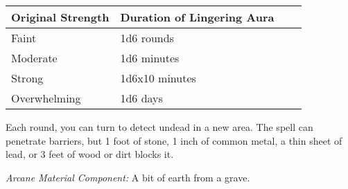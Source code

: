 \begin{longtable}{llll}
\hline
\multicolumn{1}{|p{1.203in}|}{\begin{minipage}[t]{1.203in}\raggedright
\textbf{Original Strength}\end{minipage}} & \multicolumn{1}{p{1.806in}|}{\begin{minipage}[t]{1.806in}\raggedright
\textbf{Duration of Lingering Aura}\end{minipage}}\\
\hline
\multicolumn{1}{p{0.069in}|}{\begin{minipage}[t]{0.069in}\raggedright
Faint\end{minipage}} & \multicolumn{1}{p{0.069in}|}{\begin{minipage}[t]{0.069in}\raggedright
1d6 rounds\end{minipage}}\\
\hline
\multicolumn{1}{|p{1.203in}|}{\begin{minipage}[t]{1.203in}\raggedright
Moderate\end{minipage}} & \multicolumn{1}{p{1.806in}|}{\begin{minipage}[t]{1.806in}\raggedright
1d6 minutes\end{minipage}}\\
\hline
\multicolumn{1}{p{0.069in}|}{\begin{minipage}[t]{0.069in}\raggedright
Strong\end{minipage}} & \multicolumn{1}{p{0.069in}|}{\begin{minipage}[t]{0.069in}\raggedright
1d6x10 minutes\end{minipage}}\\
\hline
\multicolumn{1}{|p{1.203in}|}{\begin{minipage}[t]{1.203in}\raggedright
Overwhelming\end{minipage}} & \multicolumn{3}{p{1.944in}|}{\begin{minipage}[t]{1.944in}\raggedright
1d6 days\end{minipage}}\\
\hline
\end{longtable}

Each round, you can turn to detect undead in a new area. The spell can penetrate 
barriers, but 1 foot of stone, 1 inch of common metal, a thin sheet of lead, or 
3 feet of wood or dirt blocks it.

\textit{Arcane Material Component:} A bit of earth from a grave.

